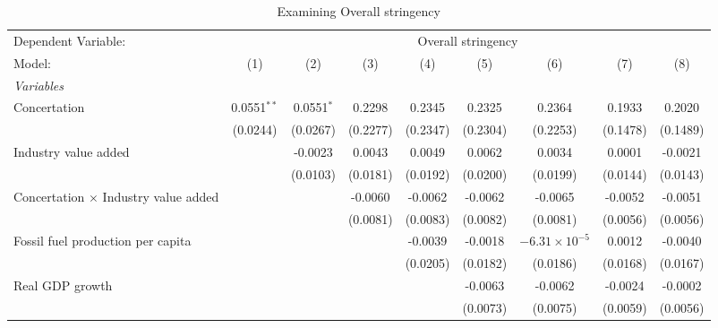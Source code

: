 
\begin{table}[htbp]
   \caption{Examining Overall stringency}
   \centering
   \begin{tabular}{lcccccccc}
      \tabularnewline \midrule \midrule
      Dependent Variable: & \multicolumn{8}{c}{Overall stringency}\\
      Model:                                      & (1)           & (2)          & (3)      & (4)      & (5)      & (6)                    & (7)      & (8)\\  
      \midrule
      \emph{Variables}\\
      Concertation                                & 0.0551$^{**}$ & 0.0551$^{*}$ & 0.2298   & 0.2345   & 0.2325   & 0.2364                 & 0.1933   & 0.2020\\   
                                                  & (0.0244)      & (0.0267)     & (0.2277) & (0.2347) & (0.2304) & (0.2253)               & (0.1478) & (0.1489)\\   
      Industry value added                        &               & -0.0023      & 0.0043   & 0.0049   & 0.0062   & 0.0034                 & 0.0001   & -0.0021\\   
                                                  &               & (0.0103)     & (0.0181) & (0.0192) & (0.0200) & (0.0199)               & (0.0144) & (0.0143)\\   
      Concertation $\times$ Industry value added  &               &              & -0.0060  & -0.0062  & -0.0062  & -0.0065                & -0.0052  & -0.0051\\   
                                                  &               &              & (0.0081) & (0.0083) & (0.0082) & (0.0081)               & (0.0056) & (0.0056)\\   
      Fossil fuel production per capita           &               &              &          & -0.0039  & -0.0018  & $-6.31\times 10^{-5}$  & 0.0012   & -0.0040\\   
                                                  &               &              &          & (0.0205) & (0.0182) & (0.0186)               & (0.0168) & (0.0167)\\   
      Real GDP growth                             &               &              &          &          & -0.0063  & -0.0062                & -0.0024  & -0.0002\\   
                                                  &               &              &          &          & (0.0073) & (0.0075)               & (0.0059) & (0.0056)\\   

\end{tabular}
\end{table}
